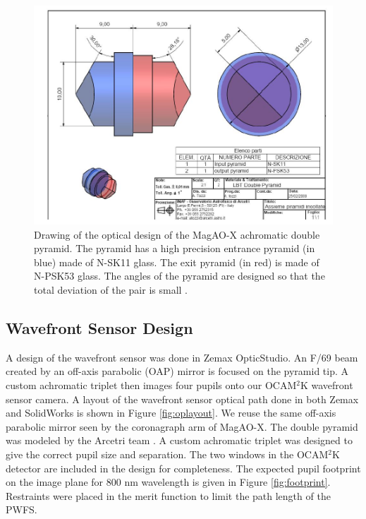 \begin{figure}
    \centering
    \includegraphics[width=.6\textwidth]{Chapter Materials/Chapter Three Materials/pyramidprismfull.JPG}
    \caption{Drawing of the optical design of the MagAO-X achromatic double pyramid. The pyramid has a high precision entrance pyramid (in blue) made of N-SK11 glass. The exit pyramid (in red) is made of N-PSK53 glass. The angles of the pyramid are designed so that the total deviation of the pair is small \citep{tozzi2008double}.}
    \label{fig:fullpyramidprism}
\end{figure}
	
	
	
\subsection{Wavefront Sensor Design}
	
A design of the wavefront sensor was done in Zemax OpticStudio. An F/69 beam created by an off-axis parabolic (OAP) mirror is focused on the pyramid tip. A custom achromatic triplet then images four pupils onto our OCAM$^2$K wavefront sensor camera. A layout of the wavefront sensor optical path done in both Zemax and SolidWorks is shown in Figure \ref{fig:oplayout}. We reuse the same off-axis parabolic mirror seen by the coronagraph arm of MagAO-X. The double pyramid was modeled by the Arcetri team \citep{tozzi2008double}. A custom achromatic triplet was designed to give the correct pupil size and separation. The two windows in the OCAM$^2$K detector are included in the design for completeness. The expected pupil footprint on the image plane for 800 nm wavelength is given in Figure \ref{fig:footprint}. Restraints were placed in the merit function to limit the path length of the PWFS. 

